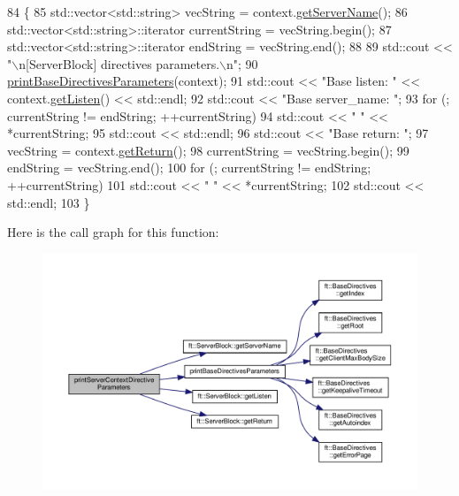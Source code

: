 \begin{DoxyCode}
84     \{
85         std::vector<std::string>        vecString = context.\hyperlink{classft_1_1_server_block_aa14d06f644ee8148fa9e2ee53d9625f9}{getServerName}();
86         std::vector<std::string>::iterator  currentString = vecString.begin();
87         std::vector<std::string>::iterator      endString = vecString.end();
88 
89         std::cout << \textcolor{stringliteral}{"\(\backslash\)n[ServerBlock] directives parameters.\(\backslash\)n"};
90         \hyperlink{namespaceft_af12105e484dbac115fe1d6a4ff074f27}{printBaseDirectivesParameters}(context);
91         std::cout << \textcolor{stringliteral}{"Base listen: "} << context.\hyperlink{classft_1_1_server_block_afc115b2997340935536bf8135e02b68c}{getListen}() << std::endl;
92         std::cout << \textcolor{stringliteral}{"Base server\_name: "};
93         \textcolor{keywordflow}{for} (; currentString != endString; ++currentString)
94             std::cout << \textcolor{stringliteral}{" "} << *currentString;
95         std::cout << std::endl;
96         std::cout << \textcolor{stringliteral}{"Base return: "};
97         vecString = context.\hyperlink{classft_1_1_server_block_aeef5e4710c02406c46e54d4aa0c8f57c}{getReturn}();
98         currentString = vecString.begin();
99         endString = vecString.end();
100         \textcolor{keywordflow}{for} (; currentString != endString; ++currentString)
101             std::cout << \textcolor{stringliteral}{" "} << *currentString;
102         std::cout << std::endl;
103     \}
\end{DoxyCode}
Here is the call graph for this function\+:
\nopagebreak
\begin{figure}[H]
\begin{center}
\leavevmode
\includegraphics[width=350pt]{namespaceft_aba285440a3c3f0158982e0376d6a24f6_cgraph}
\end{center}
\end{figure}
